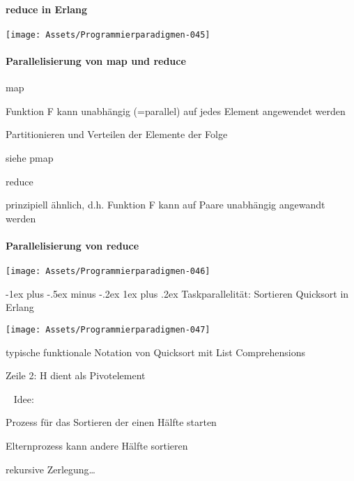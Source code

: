 \documentclass[10pt]{article}
\makeatletter
\renewcommand{\subsubsection}{\@startsection{subsubsection}{3}{0mm}%
                                {-1ex plus -.5ex minus -.2ex}%
                                {1ex plus .2ex}%
                                {\normalfont\small\bfseries}}
\makeatother
\begin{document}
\paragraph{reduce in Erlang}
\begin{center}
  \texttt{[image: Assets/Programmierparadigmen-045]}
\end{center}

\paragraph{Parallelisierung von map und reduce}
\color{orange} map \color{black}
\begin{itemize*}
  \item Funktion F kann unabhängig (=parallel) auf jedes Element angewendet werden
  \item Partitionieren und Verteilen der Elemente der Folge
  \item siehe pmap
\end{itemize*}
\color{orange} reduce \color{black}
\begin{itemize*}
  \item prinzipiell ähnlich, d.h. Funktion F kann auf Paare unabhängig angewandt werden
\end{itemize*}

\paragraph{Parallelisierung von reduce}
\begin{center}
  \texttt{[image: Assets/Programmierparadigmen-046]}
\end{center}

\subsubsection{Taskparallelität: Sortieren}
\color{orange} Quicksort in Erlang \color{black}
\begin{center}
  \texttt{[image: Assets/Programmierparadigmen-047]}
\end{center}

\begin{itemize*}
  \item typische funktionale Notation von Quicksort mit List Comprehensions
  \item Zeile 2: H dient als Pivotelement
\end{itemize*} \ \newline
Idee:
\begin{itemize*}
  \item Prozess für das Sortieren der einen Hälfte starten
  \item Elternprozess kann andere Hälfte sortieren
  \item rekursive Zerlegung…
\end{itemize*}
\end{document}

